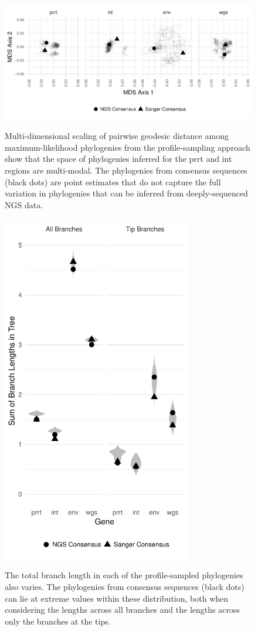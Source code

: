\documentclass[letterpaper]{article}
\begin{document}
\begin{figure}[p!]
	\caption{Multi-dimensional scaling of pairwise geodesic distance among maximum-likelihood phylogenies from the profile-sampling approach show that the space of phylogenies inferred for the prrt and int regions are multi-modal. The phylogenies from consensus sequences (black dots) are point estimates that do not capture the full variation in phylogenies that can be inferred from deeply-sequenced NGS data.}
	\centering
	\includegraphics[width=\linewidth]{Figure2}
	\label{fig2}
\end{figure}
	
\begin{figure}[p!]
	\caption{The total branch length in each of the profile-sampled phylogenies also varies. The phylogenies from consensus sequences (black dots) can lie at extreme values within these distribution, both when considering the lengths across all branches and the lengths across only the branches at the tips.}
	\centering
	\includegraphics[width=3.25in]{Figure3}
	\label{fig3}
\end{figure}
\end{document}
